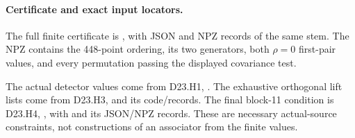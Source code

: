 \paragraph{Certificate and exact input locators.}
The full finite certificate is
, with JSON and
NPZ records of the same stem. The NPZ contains the
448-point ordering, its two generators, both
$\rho=0$ first-pair values, and every permutation
passing the displayed covariance test.

The actual detector values come from D23.H1,
.
The exhaustive orthogonal lift lists come from D23.H3,
 and its
code/records. The final block-11 condition is D23.H4,
, with
 and its
JSON/NPZ records. These are necessary actual-source
constraints, not constructions of an associator from
the finite values.
